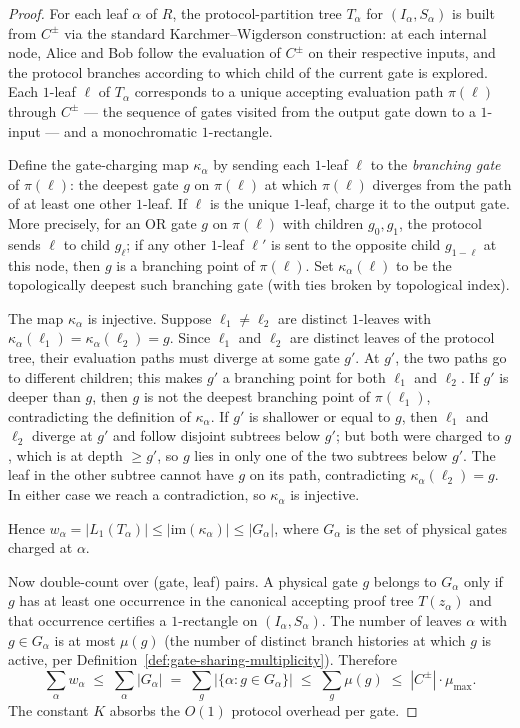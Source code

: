 \documentclass[11pt]{article}
\begin{document}
\begin{proof}
For each leaf $\alpha$ of $R$, the protocol-partition tree $T_\alpha$
for $(I_\alpha, S_\alpha)$ is built from $C^{\pm}$ via the standard
Karchmer--Wigderson construction: at each internal node, Alice and Bob
follow the evaluation of $C^{\pm}$ on their respective inputs, and the
protocol branches according to which child of the current gate is
explored.  Each $1$-leaf $\ell$ of $T_\alpha$ corresponds to a unique
accepting evaluation path $\pi(\ell)$ through $C^{\pm}$ --- the
sequence of gates visited from the output gate down to a $1$-input ---
and a monochromatic $1$-rectangle.

Define the gate-charging map $\kappa_\alpha$ by sending each $1$-leaf
$\ell$ to the \emph{branching gate} of $\pi(\ell)$: the deepest gate $g$
on $\pi(\ell)$ at which $\pi(\ell)$ diverges from the path of at least
one other $1$-leaf.  If $\ell$ is the unique $1$-leaf, charge it to the
output gate.  More precisely, for an OR gate $g$ on $\pi(\ell)$ with
children $g_0, g_1$, the protocol sends $\ell$ to child $g_{\ell}$; if
any other $1$-leaf $\ell'$ is sent to the opposite child $g_{1-\ell}$
at this node, then $g$ is a branching point of $\pi(\ell)$.  Set
$\kappa_\alpha(\ell)$ to be the topologically deepest such branching
gate (with ties broken by topological index).

The map $\kappa_\alpha$ is injective.  Suppose $\ell_1 \neq \ell_2$
are distinct $1$-leaves with $\kappa_\alpha(\ell_1)
= \kappa_\alpha(\ell_2) = g$.  Since $\ell_1$ and $\ell_2$ are
distinct leaves of the protocol tree, their evaluation paths must
diverge at some gate $g'$.  At $g'$, the two paths go to different
children; this makes $g'$ a branching point for both $\ell_1$ and
$\ell_2$.  If $g'$ is deeper than $g$, then $g$ is not the deepest
branching point of $\pi(\ell_1)$, contradicting the definition of
$\kappa_\alpha$.  If $g'$ is shallower or equal to $g$, then $\ell_1$
and $\ell_2$ diverge at $g'$ and follow disjoint subtrees below $g'$;
but both were charged to $g$, which is at depth $\ge g'$, so $g$ lies
in only one of the two subtrees below $g'$.  The leaf in the other
subtree cannot have $g$ on its path, contradicting
$\kappa_\alpha(\ell_2) = g$.  In either case we reach a contradiction,
so $\kappa_\alpha$ is injective.

Hence $w_\alpha = |L_1(T_\alpha)| \le |\mathrm{im}(\kappa_\alpha)|
\le |G_\alpha|$, where $G_\alpha$ is the set of physical gates charged
at $\alpha$.

Now double-count over (gate, leaf) pairs.  A physical gate $g$ belongs to
$G_\alpha$ only if $g$ has at least one occurrence in the canonical
accepting proof tree $T(z_\alpha)$ and that occurrence certifies a
$1$-rectangle on $(I_\alpha, S_\alpha)$.  The number of leaves $\alpha$
with $g \in G_\alpha$ is at most $\mu(g)$ (the number of distinct branch
histories at which $g$ is active, per
Definition~\ref{def:gate-sharing-multiplicity}).  Therefore
\[
\sum_\alpha w_\alpha
\;\le\; \sum_\alpha |G_\alpha|
\;=\; \sum_g |\{\alpha : g \in G_\alpha\}|
\;\le\; \sum_g \mu(g)
\;\le\; |C^{\pm}| \cdot \mu_{\max}.
\]
The constant $K$ absorbs the $O(1)$ protocol overhead per gate.
\end{proof}
\end{document}
